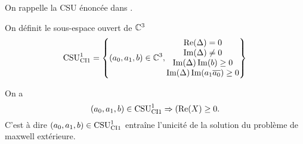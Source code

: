     On rappelle la CSU énoncée dans \cite{stupfel_sufficient_2011}.

    \begin{defn}
      \label{def:csu:ci1-1}

      On définit le sous-espace ouvert de \(\CC^3\)
      \begin{equation*}
        \CSU[1]{CI1} = \left\lbrace 
        (a_0,a_1,b) \in \CC^3,
        \begin{matrix}
        \Re(\Delta) = 0
        \\
        \Im(\Delta) \not = 0
        \\
        \Im(\Delta)\Im(b) \ge 0
        \\
        \Im(\Delta )\Im(a_1\conj{a_0})\ge 0
        \end{matrix}
        \right\rbrace
      \end{equation*}
    \end{defn}

    \begin{prop}
      \label{prop:csu:ci1-1}
      On a 
      \begin{equation*}
        (a_0,a_1,b) \in \CSU[1]{CI1} \Rightarrow (\Re(X)\ge 0. 
      \end{equation*}
      C'est à dire \((a_0,a_1,b) \in \CSU[1]{CI1}\) entraîne l'unicité de la solution du problème de maxwell extérieure.
    \end{prop}

